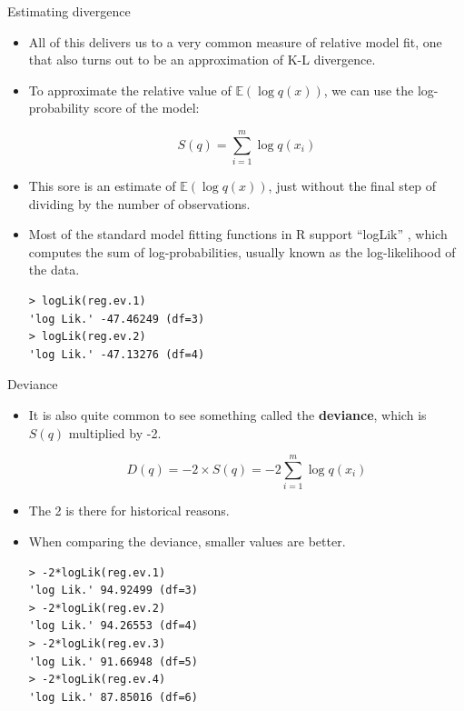 \documentclass[handout]{beamer}
\begin{document}
\begin{frame}[fragile]{Estimating divergence}
\scriptsize{

\begin{itemize}

\item All of this delivers us to a very common measure of relative model fit, one that also turns out to be an approximation of K-L divergence. 
\item To approximate the relative value of $\mathbb{E}(\log q(x))$, we can use the log-probability score of the model:

\begin{equation}
S(q) = \sum_{i=1}^m \log q(x_i)
\end{equation}


\item This sore is an estimate of $\mathbb{E}(\log q(x))$, just without the final step of dividing by the number of observations.


\item Most of the standard model fitting functions in R support ``logLik'' , which computes the sum of log-probabilities, usually
known as the log-likelihood of the data.

\begin{verbatim}
> logLik(reg.ev.1)
'log Lik.' -47.46249 (df=3)
> logLik(reg.ev.2)
'log Lik.' -47.13276 (df=4) 
\end{verbatim}




\end{itemize}


} 
\end{frame}


\begin{frame}[fragile]{Deviance}
\scriptsize{

\begin{itemize}

\item It is also quite common to see something called the \textbf{deviance}, which is $S(q)$ multiplied by -2.

\begin{equation}
D(q) = -2\times S(q)= -2 \sum_{i=1}^m \log q(x_i)
\end{equation}


\item The 2 is there for historical reasons.

\item When comparing the deviance,  smaller values are better.  

\begin{verbatim}
> -2*logLik(reg.ev.1)
'log Lik.' 94.92499 (df=3)
> -2*logLik(reg.ev.2)
'log Lik.' 94.26553 (df=4)
> -2*logLik(reg.ev.3)
'log Lik.' 91.66948 (df=5)
> -2*logLik(reg.ev.4)
'log Lik.' 87.85016 (df=6) 
\end{verbatim}



\end{itemize}


} 
\end{frame}
\end{document}

